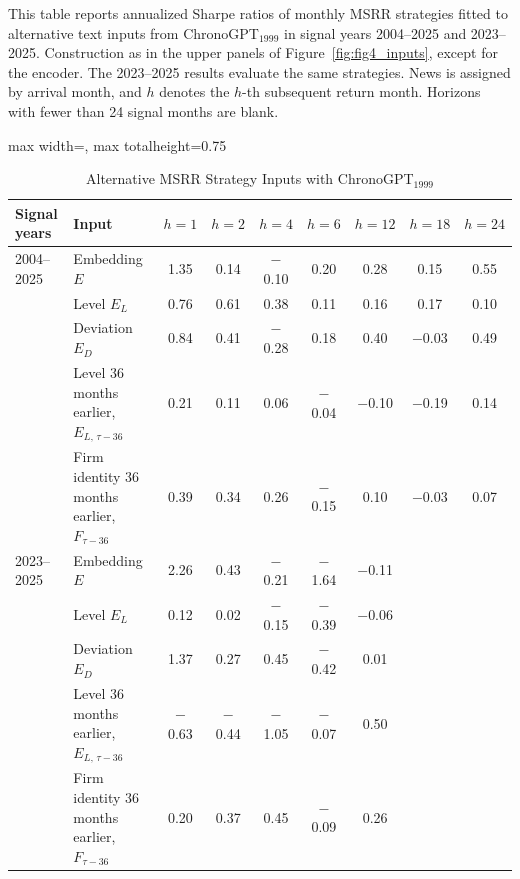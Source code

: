 \begin{table}[htbp]
\centering
\caption{Alternative MSRR Strategy Inputs with ChronoGPT$_{1999}$}
\label{tab:tabB_constructions}
\begin{minipage}{\linewidth}\footnotesize
This table reports annualized Sharpe ratios of monthly MSRR strategies fitted to alternative text inputs from ChronoGPT$_{1999}$ in signal years 2004--2025 and 2023--2025. Construction as in the upper panels of Figure~\ref{fig:fig4_inputs}, except for the encoder. The 2023--2025 results evaluate the same strategies. News is assigned by arrival month, and $h$ denotes the $h$-th subsequent return month. Horizons with fewer than 24 signal months are blank.
\end{minipage}
\medskip

{\footnotesize
\begin{adjustbox}{max width=\linewidth, max totalheight=0.75\textheight}
\begin{tabular}{llccccccc}
\toprule
Signal years & Input & $h=1$ & $h=2$ & $h=4$ & $h=6$ & $h=12$ & $h=18$ & $h=24$ \\
\midrule
2004--2025 & Embedding $E$ & \phantom{$-$}1.35 & \phantom{$-$}0.14 & $-$0.10 & \phantom{$-$}0.20 & \phantom{$-$}0.28 & \phantom{$-$}0.15 & 0.55 \\
 & Level $E_L$ & \phantom{$-$}0.76 & \phantom{$-$}0.61 & \phantom{$-$}0.38 & \phantom{$-$}0.11 & \phantom{$-$}0.16 & \phantom{$-$}0.17 & 0.10 \\
 & Deviation $E_D$ & \phantom{$-$}0.84 & \phantom{$-$}0.41 & $-$0.28 & \phantom{$-$}0.18 & \phantom{$-$}0.40 & $-$0.03 & 0.49 \\
 & Level 36 months earlier, $E_{L,\,\tau-36}$ & \phantom{$-$}0.21 & \phantom{$-$}0.11 & \phantom{$-$}0.06 & $-$0.04 & $-$0.10 & $-$0.19 & 0.14 \\
 & Firm identity 36 months earlier, $F_{\tau-36}$ & \phantom{$-$}0.39 & \phantom{$-$}0.34 & \phantom{$-$}0.26 & $-$0.15 & \phantom{$-$}0.10 & $-$0.03 & 0.07 \\
\midrule
2023--2025 & Embedding $E$ & \phantom{$-$}2.26 & \phantom{$-$}0.43 & $-$0.21 & $-$1.64 & $-$0.11 &  &  \\
 & Level $E_L$ & \phantom{$-$}0.12 & \phantom{$-$}0.02 & $-$0.15 & $-$0.39 & $-$0.06 &  &  \\
 & Deviation $E_D$ & \phantom{$-$}1.37 & \phantom{$-$}0.27 & \phantom{$-$}0.45 & $-$0.42 & \phantom{$-$}0.01 &  &  \\
 & Level 36 months earlier, $E_{L,\,\tau-36}$ & $-$0.63 & $-$0.44 & $-$1.05 & $-$0.07 & \phantom{$-$}0.50 &  &  \\
 & Firm identity 36 months earlier, $F_{\tau-36}$ & \phantom{$-$}0.20 & \phantom{$-$}0.37 & \phantom{$-$}0.45 & $-$0.09 & \phantom{$-$}0.26 &  &  \\
\bottomrule
\end{tabular}
\end{adjustbox}
}
\end{table}
